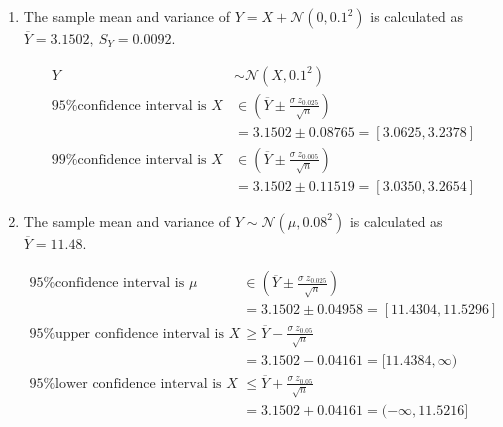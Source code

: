 \begin{enumerate}
\begin{subequations}
\begin{enumerate}
		\item To find variance, set $ t = 2 $,
		\begin{align}
			\mathbb{E}[X^2] &= \exp \left(2\mu + 2\sigma^2\right) \nonumber \\
			\mathrm{Var}(X) &= \exp \left(2\mu + 2\sigma^2\right) - \exp \left(2\mu + \sigma^2\right)
		\end{align}
	
		\item Calculating mean travel time using the above formulae,
		find $\mu =  \overline{Y} = 45.4 $ and $ \sigma^2 = S_Y^2 = 131.82 $.
		
		\begin{align}
			\mathbb{E}[X] &= \exp \left(\mu + 0.5\sigma^2\right) = 45.56
		\end{align}
		
	\end{enumerate}
	\end{subequations}

	\item The sample mean and variance of $ Y = X + \mathcal{N} (0, 0.1^2) $ is calculated as
	 $ \overline{Y} = 3.1502,\ S_Y = 0.0092 $.
	
	\begin{subequations}
		\begin{align}
			Y &\sim \mathcal{N}(X, 0.1^2) \nonumber \\
			\text{95\% confidence interval is } X &\in \left(\overline{Y} \pm\frac{\sigma\ z_{0.025}}{\sqrt{n}}\right) \nonumber \\
			&= 3.1502 \pm 0.08765 = [3.0625, 3.2378] \\
			\text{99\% confidence interval is } X &\in \left(\overline{Y} \pm\frac{\sigma\ z_{0.005}}{\sqrt{n}}\right) \nonumber \\
			&= 3.1502 \pm 0.11519 = [3.0350, 3.2654]
		\end{align}
	\end{subequations}
	
	\item The sample mean and variance of $ Y \sim \mathcal{N} (\mu, 0.08^2) $ is calculated as
	$ \overline{Y} = 11.48$.
	
	\begin{subequations}
		\begin{align}
			\text{95\% confidence interval is } \mu &\in \left(\overline{Y} \pm\frac{\sigma\ z_{0.025}}{\sqrt{n}}\right) \nonumber \\
			&= 3.1502 \pm 0.04958 = [11.4304, 11.5296] \\
			\text{95\% upper confidence interval is } X &\geq \overline{Y} - \frac{\sigma\ z_{0.05}}{\sqrt{n}} \nonumber \\
			&= 3.1502 - 0.04161 = [11.4384, \infty) \nonumber \\
			\text{95\% lower confidence interval is } X &\leq \overline{Y} + \frac{\sigma\ z_{0.05}}{\sqrt{n}} \nonumber \\
			&= 3.1502 + 0.04161 = (-\infty, 11.5216]
		\end{align}
	\end{subequations}


\end{enumerate}
